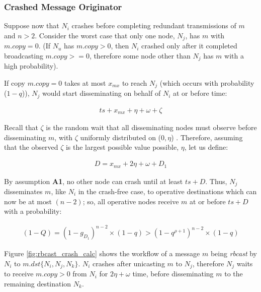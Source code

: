         \subsubsection*{Crashed Message Originator}
Suppose now that $N_i$ crashes before completing redundant transmissions of $m$ and $n>2$. Consider the worst case that only one node, $N_j$, has $m$ with $m.copy=0$. (If $N_u$ has $m.copy>0$, then $N_i$ crashed only after it completed broadcasting $m.copy >= 0$, therefore some node other than $N_j$ has $m$ with a high probability).

If copy $m.copy = 0$ takes at most $x_{mx}$ to reach $N_j$ (which occurs with probability ($1-q$)), $N_j$ would start disseminating on behalf of $N_i$ at or before time:
        
        \begin{equation*}
		    \begin{aligned}
		        ts+ x_{mx} + \eta + \omega +\zeta
		    \end{aligned}
		\end{equation*}
		
Recall that $\zeta$ is the random wait that all disseminating nodes must observe before disseminating $m$, with $\zeta$ uniformly distributed on ($0, \eta$) .  Therefore, assuming that the observed $\zeta$ is the largest possible value possible, $\eta$, let us define: 

        \begin{equation*}
		    \begin{aligned}
		        D = x_{mx} + 2\eta + \omega + D_1
		    \end{aligned}
		\end{equation*}
		
By assumption \textbf{A1}, no other node can crash until at least $ts+D$. Thus, $N_j$ disseminates $m$, like $N_i$ in the crash-free case, to operative destinations which can now be at most $(n-2)$; so, all operative nodes receive $m$ at or before $ts +D$ with a probability: 
        
        \begin{equation*}
		    \begin{aligned}
		        (1-Q) = (1-g_{D_1})^{n-2}\times (1-q)>(1-q^{\rho+1})^{n-2}\times(1-q)
		    \end{aligned}
		\end{equation*}

Figure \ref{fig:rbcast_crash_calc} shows the workflow of a message $m$ being \emph{rbcast} by $N_i$ to $m.dst \{N_i, N_j, N_k\}$.  $N_i$ crashes after unicasting $m$ to $N_j$, therefore $N_j$ waits to receive $m.copy > 0$ from $N_i$ for $2\eta + \omega$ time, before disseminating $m$ to the remaining destination $N_k$.  

